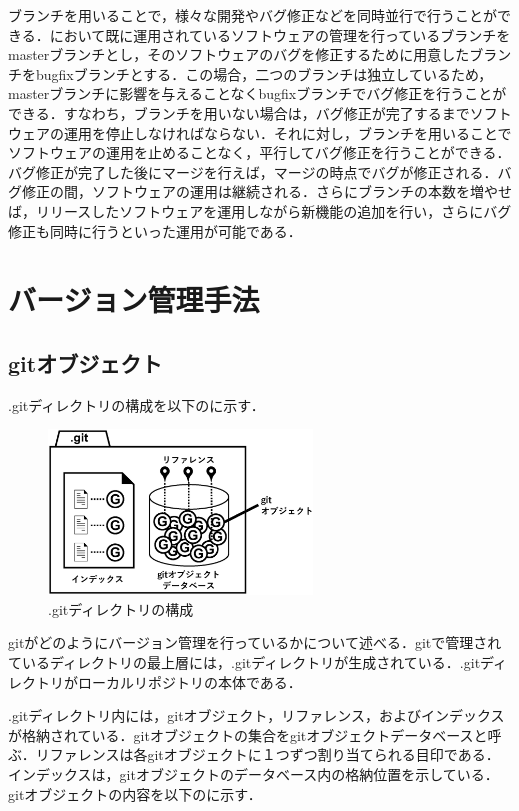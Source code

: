 \documentclass[a4j,9pt,twocolumn]{jsarticle}
\begin{document}
ブランチを用いることで，様々な開発やバグ修正などを同時並行で行うことができる．において既に運用されているソフトウェアの管理を行っているブランチをmasterブランチとし，そのソフトウェアのバグを修正するために用意したブランチをbugfixブランチとする．この場合，二つのブランチは独立しているため，masterブランチに影響を与えることなくbugfixブランチでバグ修正を行うことができる．すなわち，ブランチを用いない場合は，バグ修正が完了するまでソフトウェアの運用を停止しなければならない．それに対し，ブランチを用いることでソフトウェアの運用を止めることなく，平行してバグ修正を行うことができる．バグ修正が完了した後にマージを行えば，マージの時点でバグが修正される．バグ修正の間，ソフトウェアの運用は継続される．さらにブランチの本数を増やせば，リリースしたソフトウェアを運用しながら新機能の追加を行い，さらにバグ修正も同時に行うといった運用が可能である．

\section{バージョン管理手法}
\subsection{gitオブジェクト}
.gitディレクトリの構成を以下のに示す．

\begin{figure}[h]
\centering
\includegraphics[width=70mm]{img/git_obj.eps}
\caption{.gitディレクトリの構成}
\label{object1}
\end{figure}

gitがどのようにバージョン管理を行っているかについて述べる\cite{mecha}．gitで管理されているディレクトリの最上層には，.gitディレクトリが生成されている．.gitディレクトリがローカルリポジトリの本体である．

.gitディレクトリ内には，gitオブジェクト，リファレンス，およびインデックスが格納されている．gitオブジェクトの集合をgitオブジェクトデータベースと呼ぶ．リファレンスは各gitオブジェクトに１つずつ割り当てられる目印である．インデックスは，gitオブジェクトのデータベース内の格納位置を示している．gitオブジェクトの内容を以下のに示す．
\end{document}
